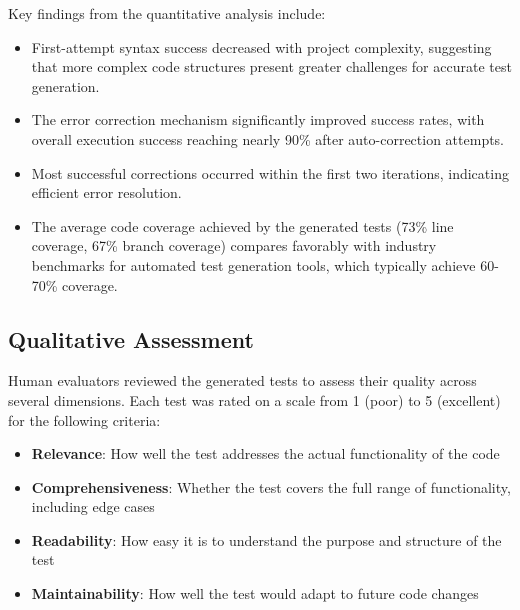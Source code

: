 Key findings from the quantitative analysis include:

\begin{itemize}
    \item First-attempt syntax success decreased with project complexity, suggesting that more complex code structures present greater challenges for accurate test generation.
    
    \item The error correction mechanism significantly improved success rates, with overall execution success reaching nearly 90\% after auto-correction attempts.
    
    \item Most successful corrections occurred within the first two iterations, indicating efficient error resolution.
    
    \item The average code coverage achieved by the generated tests (73\% line coverage, 67\% branch coverage) compares favorably with industry benchmarks for automated test generation tools, which typically achieve 60-70\% coverage.
\end{itemize}

\subsection{Qualitative Assessment}

Human evaluators reviewed the generated tests to assess their quality across several dimensions. Each test was rated on a scale from 1 (poor) to 5 (excellent) for the following criteria:

\begin{itemize}
    \item \textbf{Relevance}: How well the test addresses the actual functionality of the code
    \item \textbf{Comprehensiveness}: Whether the test covers the full range of functionality, including edge cases
    \item \textbf{Readability}: How easy it is to understand the purpose and structure of the test
    \item \textbf{Maintainability}: How well the test would adapt to future code changes
\end{itemize}

